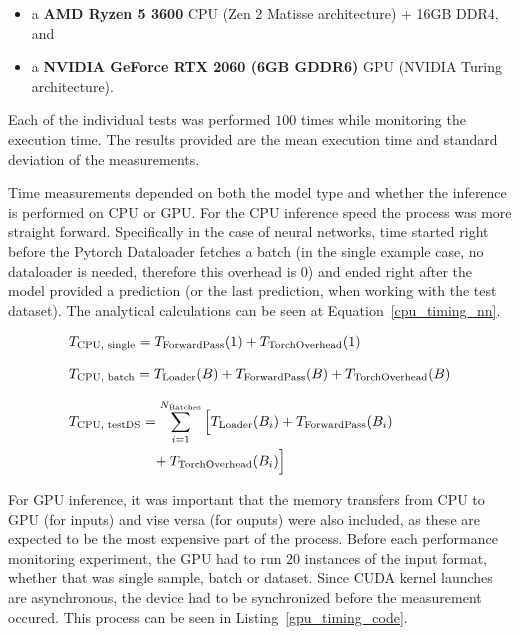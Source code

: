\begin{itemize}
    \item a \textbf{AMD Ryzen 5 3600} CPU (Zen 2 Matisse architecture) + 16GB DDR4, and
    \item a \textbf{NVIDIA GeForce RTX 2060 (6GB GDDR6)} GPU (NVIDIA Turing architecture).
\end{itemize}

Each of the individual tests was performed $100$ times while monitoring the execution time. The results provided are the mean execution time and standard deviation of the measurements.

Time measurements depended on both the model type and whether the inference is performed on CPU or GPU. For the CPU inference speed the process was more straight forward. Specifically in the case of neural networks, time started right before the Pytorch Dataloader fetches a batch (in the single example case, no dataloader is needed, therefore this overhead is $0$) and ended right after the model provided a prediction (or the last prediction, when working with the test dataset). The analytical calculations can be seen at Equation~\ref{cpu_timing_nn}.

\begin{subequations}\label{cpu_timing_nn}
\renewcommand{\theequation}{\theparentequation.\arabic{equation}}
\begin{align}
&T_{\text{CPU, single}} =
T_{\text{ForwardPass}}(1) +
T_{\text{TorchOverhead}}(1)
\label{eq:cpu_single}\\[8pt]
&T_{\text{CPU, batch}} =
T_{\text{Loader}}(B) +
T_{\text{ForwardPass}}(B) +
T_{\text{TorchOverhead}}(B)
\label{eq:cpu_batch}\\[8pt]
&T_{\text{CPU, testDS}} =
\sum_{i=1}^{N_{\text{Batches}}}
\Big[
T_{\text{Loader}}(B_i) +
T_{\text{ForwardPass}}(B_i)
\notag\\
&\qquad\qquad\qquad+
T_{\text{TorchOverhead}}(B_i)
\Big]
\label{eq:cpu_testDS}
\end{align}
\end{subequations}

For GPU inference, it was important that the memory transfers from CPU to GPU (for inputs) and vise versa (for ouputs) were also included, as these are expected to be the most expensive part of the process. Before each performance monitoring experiment, the GPU had to run $20$ instances of the input format, whether that was single sample, batch or dataset. Since CUDA kernel launches are asynchronous, the device had to be synchronized before the measurement occured. This process can be seen in Listing~\ref{gpu_timing_code}.

